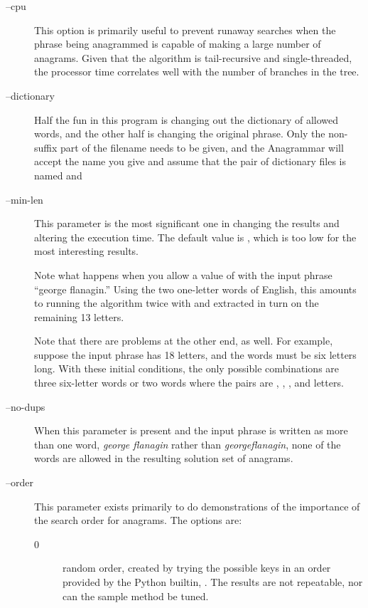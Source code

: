 \documentclass[letterpaper, 11pt]{article}
\begin{document}
\begin{description}
\item[--cpu] This option is primarily useful to prevent runaway searches
when the phrase being anagrammed is capable of making a large number of 
anagrams. Given that the algorithm is tail-recursive and single-threaded,
the processor time correlates well with the number of branches in the
tree.

\item[--dictionary] Half the fun in this program is changing out
the dictionary of allowed words, and the other half is changing the
original phrase. Only the non-suffix part of the filename needs to
be given, and the Anagrammar will accept the name you give and assume
that the pair of dictionary files is named  and 
 
\item[--min-len] This parameter is the most significant one in
changing the results and altering the execution time. The default
value is , which is too low for the most interesting results. 

Note what happens when you allow a value of  with the input
phrase ``george flanagin.'' Using the two one-letter words of English,
this amounts to running the algorithm twice with  and  
extracted in turn on the remaining 13 letters. 

Note that there are problems at the other end, as well. For example,
suppose the input phrase has 18 letters, and the words must be six letters
long. With these initial conditions, the only possible combinations are three six-letter words
or two words where the pairs are , , , and  letters.

\item[--no-dups] When this parameter is present and the input
phrase is written as more than one word, \ie \emph{george flanagin} 
rather than \emph{georgeflanagin}, none of the words are allowed 
in the resulting solution set of anagrams.

\item[--order] This parameter exists primarily to do demonstrations
of the importance of the search order for anagrams. The options are:

\begin{description}
\item[0] random order, created by trying the possible keys in 
an order provided by the Python builtin, . The
results are not repeatable, nor can the sample method be tuned.


\end{description}
\end{description}
\end{document}
